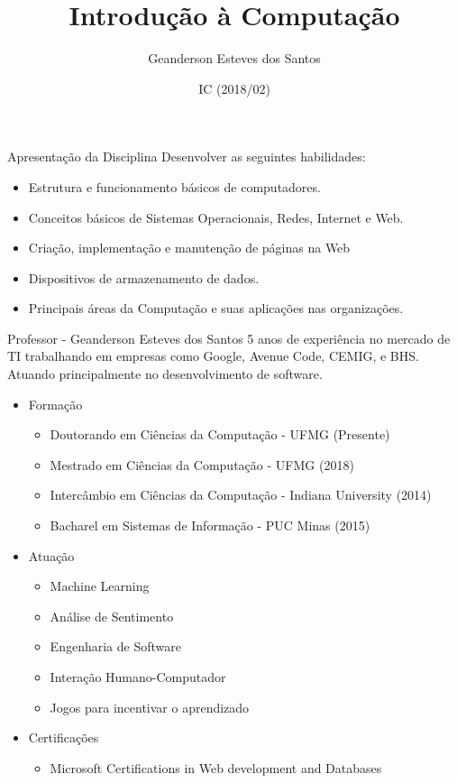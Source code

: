 \documentclass{beamer}
\title{Introdução à Computação}
\author{Geanderson Esteves dos Santos}
\institute[] 
{
  Pontifícia Universidade Católica de Minas Gerais\\
  Instituto de Ciências Exatas e Informática
}
\date{IC (2018/02)}
\begin{document}
\begin{frame}
  \titlepage
\end{frame}

\begin{frame}{Apresentação da Disciplina}
Desenvolver as seguintes habilidades:
\begin{itemize}
\item Estrutura e funcionamento básicos de computadores.
\item Conceitos básicos de Sistemas Operacionais, Redes, Internet e Web.
\item Criação, implementação e manutenção de páginas na Web
\item Dispositivos de armazenamento de dados.
\item Principais áreas da Computação e suas aplicações nas organizações.
\end{itemize}
\end{frame}

\begin{frame}{Professor - Geanderson Esteves dos Santos}
5 anos de experiência no mercado de TI trabalhando em empresas como Google, Avenue Code, CEMIG, e BHS. Atuando principalmente no desenvolvimento de software.
\begin{itemize}
\item Formação
\begin{itemize}
    \item Doutorando em Ciências da Computação - UFMG (Presente)
    \item Mestrado em Ciências da Computação - UFMG (2018)
    \item Intercâmbio em Ciências da Computação - Indiana University (2014)
    \item Bacharel em Sistemas de Informação - PUC Minas (2015)
\end{itemize}
\item Atuação
\begin{itemize}
    \item Machine Learning
    \item Análise de Sentimento
    \item Engenharia de Software
    \item Interação Humano-Computador
    \item Jogos para incentivar o aprendizado
\end{itemize}
\item Certificações
\begin{itemize}
    \item Microsoft Certifications in Web development and Databases
\end{itemize}
\end{itemize}
\end{frame}
\end{document}
